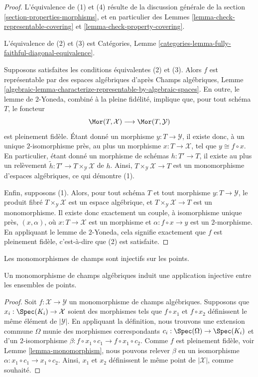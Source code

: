 \begin{proof}
L'équivalence de (1) et (4) résulte de la discussion générale de la
section \ref{section-properties-morphisms},
et en particulier des
Lemmes \ref{lemma-check-representable-covering} et
\ref{lemma-check-property-covering}.

\medskip\noindent
L'équivalence de (2) et (3) est
Catégories, Lemme \ref{categories-lemma-fully-faithful-diagonal-equivalence}.

\medskip\noindent
Supposons satisfaites les conditions équivalentes (2) et (3). Alors $f$ est représentable
par des espaces algébriques d'après
Champs algébriques,
Lemme \ref{algebraic-lemma-characterize-representable-by-algebraic-spaces}.
En outre, le lemme de $2$-Yoneda, combiné à la pleine fidélité,
implique que, pour tout schéma $T$, le foncteur
$$
\Mor(T, \mathcal{X})
\longrightarrow
\Mor(T, \mathcal{Y})
$$
est pleinement fidèle. Étant donné un morphisme $y : T \to \mathcal{Y}$, il existe donc,
à un unique $2$-isomorphisme près, au plus un morphisme $x : T \to \mathcal{X}$,
tel que $y \cong f \circ x$. En particulier, étant donné un morphisme de schémas
$h : T' \to T$, il existe au plus un relèvement
$\tilde h : T' \to T \times_\mathcal{Y} \mathcal{X}$ de $h$.
Ainsi, $T \times_\mathcal{Y} \mathcal{X} \to T$ est un monomorphisme
d'espaces algébriques, ce qui démontre (1).

\medskip\noindent
Enfin, supposons (1). Alors, pour tout schéma $T$ et tout morphisme
$y : T \to \mathcal{Y}$, le produit fibré $T \times_\mathcal{Y} \mathcal{X}$
est un espace algébrique, et $T \times_\mathcal{Y} \mathcal{X} \to T$
est un monomorphisme. Il existe donc exactement un couple, à isomorphisme unique près,
$(x, \alpha)$, où $x : T \to \mathcal{X}$ est un morphisme
et $\alpha : f \circ x \to y$ est un $2$-morphisme. En appliquant
le lemme de $2$-Yoneda, cela signifie exactement que $f$ est pleinement fidèle, c'est-à-dire
que (2) est satisfaite.
\end{proof}

\begin{lemma}
\label{lemma-monomorphism-injective-points}
\begin{slogan}
Les monomorphismes de champs sont injectifs sur les points.
\end{slogan}
Un monomorphisme de champs algébriques induit une application injective entre les
ensembles de points.
\end{lemma}

\begin{proof}
Soit $f : \mathcal{X} \to \mathcal{Y}$ un monomorphisme de champs algébriques.
Supposons que $x_i : \Spec(K_i) \to \mathcal{X}$ soient des morphismes tels que
$f \circ x_1$ et $f \circ x_2$ définissent le même élément de $|\mathcal{Y}|$.
En appliquant la définition, nous trouvons une extension commune $\Omega$ munie des
morphismes correspondants $c_i : \Spec(\Omega) \to \Spec(K_i)$ et d'un
$2$-isomorphisme $\beta : f \circ x_1 \circ c_1 \to f \circ x_1 \circ c_2$.
Comme $f$ est pleinement fidèle, voir
Lemme \ref{lemma-monomorphism},
nous pouvons relever $\beta$ en un isomorphisme
$\alpha : x_1 \circ c_1 \to x_1 \circ c_2$.
Ainsi, $x_1$ et $x_2$ définissent le même point de $|\mathcal{X}|$,
comme souhaité.
\end{proof}

